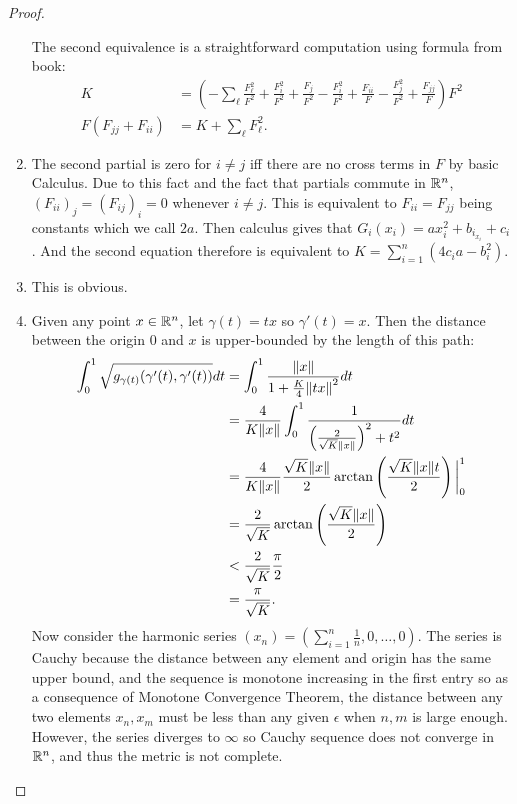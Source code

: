 \documentclass[12pt]{article}
\begin{document}
\begin{proof}
\begin{enumerate}[label=(\alph*)]
	The second equivalence is a straightforward computation using formula from book:
	\begin{align*}
		K &= \left( - \sum_{\ell} \frac{F_\ell^2}{ F^2} + \frac{F_i^2}{ F^2} + \frac{F_j}{ F^2} - \frac{F_i^2}{ F^2} + \frac{F_{ii} }{ F} - \frac{F_j^2}{ F^2} + \frac{F_{jj}}{ F}  \right)F^2\\
	F(F_{jj} + F_{ii} )	&= K + \sum_{\ell} F_{\ell}^2 .
	\end{align*}
\item The second partial is zero for $ i \neq j$ iff there are no cross terms in  $ F$ by basic Calculus.  Due to this fact and the fact that partials commute in $ \mathbb{R}^{n}$, $ (F_{ii})_j = (F_{ij})_i =0$ whenever $ i \neq j$. This is equivalent to $ F_{ii} = F_{jj}$ being constants which we call $ 2a$. Then calculus gives that $ G_i(x_i) = a x_i^2 + b_i_ x_i + c_i$. And the second equation therefore is equivalent to $ K = \sum_{ i= 1}^{ n} (4 c_i a - b_i^2)$.   
\item This is obvious.
\item Given any point $ x \in \mathbb{R}^{n}$, let $ \gamma(t) = tx$ so $ \gamma'(t) = x$. Then the distance between the origin $ 0$ and  $ x$ is upper-bounded by the length of this path:
\begin{align*}
	\int_{ 0}^{ 1} \sqrt{g_{ \gamma(t)}( \gamma'(t), \gamma'(t))} dt &=  \int_0^1 \frac{ {\left\lVert{  x}\right\rVert}  }{ 1+ \frac{K}{4} {\left\lVert{ t x}\right\rVert}^2   } dt \\
	&= \frac{4}{K {\left\lVert{ x}\right\rVert} } \int_{ 0}^{ 1} \frac{1}{ \left( \frac{2}{\sqrt{K} {\left\lVert{ x}\right\rVert} } \right)^2  +  t^2} dt  \\
	&= \frac{4}{K{\left\lVert{ x}\right\rVert} } \frac{\sqrt{K} {\left\lVert{ x}\right\rVert}  }{2 } \arctan \left( \frac{\sqrt{K} {\left\lVert{ x}\right\rVert} t}{2} \right)\bigg|_{0}^1   \\
	&= \frac{2}{\sqrt{K} } \arctan\left( \frac{\sqrt{K} {\left\lVert{ x}\right\rVert}  }{ 2}  \right)  \\
	&< \frac{2}{\sqrt{K} } \frac{\pi}{ 2}  \\
	&= \frac{\pi}{ \sqrt{K} }   .
\end{align*}
	Now consider the harmonic series $ (x_n) = \left(\sum_{ i= 1}^{ n} \frac{1}{n},0,\ldots,0\right)$. The series is Cauchy because the distance between any element and origin has the same upper bound, and the sequence is monotone increasing in the first entry so as a consequence of Monotone Convergence Theorem, the distance between any two elements $ x_n, x_m$ must be less than any given $ \epsilon$ when $ n,m$ is large enough. However, the series diverges to $ \infty$ so Cauchy sequence does not converge in $ \mathbb{R}^{n}$, and thus the metric is not complete.
\end{enumerate}
\end{proof}
\end{document}
